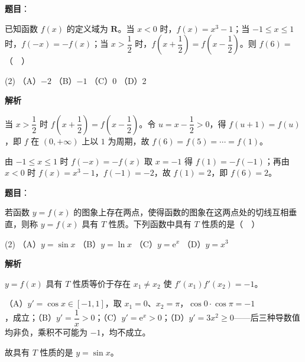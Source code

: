 \begin{answer}

\textbf{题目}：

已知函数 \(f(x)\) 的定义域为 \(\mathbf{R}\)。当 \(x<0\) 时，\(f(x)=x^3-1\)；当 \(-1\leqslant x\leqslant 1\) 时，\(f(-x)=-f(x)\)；当 \(x>\dfrac{1}{2}\) 时，\(f\left(x+\dfrac{1}{2}\right)=f\left(x-\dfrac{1}{2}\right)\)。则 \(f(6)=\)（　）

\begin{gkopts}(2)
\task （A）\(-2\)
\task （B）\(-1\)
\task （C）0
\task （D）2
\end{gkopts}

\textbf{解析}

当 \(x>\dfrac{1}{2}\) 时 \(f\left(x+\dfrac{1}{2}\right)=f\left(x-\dfrac{1}{2}\right)\)。令 \(u=x-\dfrac{1}{2}>0\)，得 \(f(u+1)=f(u)\)，即 \(f\) 在 \((0,+\infty)\) 上以 \(1\) 为周期，故 \(f(6)=f(5)=\cdots=f(1)\)。

由 \(-1\leqslant x\leqslant 1\) 时 \(f(-x)=-f(x)\) 取 \(x=-1\) 得 \(f(1)=-f(-1)\)；再由 \(x<0\) 时 \(f(x)=x^{3}-1\)，\(f(-1)=-2\)，故 \(f(1)=2\)，即 \(f(6)=2\)。


\end{answer}
\begin{answer}

\textbf{题目}：

若函数 \(y=f(x)\) 的图象上存在两点，使得函数的图象在这两点处的切线互相垂直，则称 \(y=f(x)\) 具有 \(T\) 性质。下列函数中具有 \(T\) 性质的是（　）

\begin{gkopts}(2)
\task （A）\(y=\sin x\)
\task （B）\(y=\ln x\)
\task （C）\(y=\mathrm{e}^x\)
\task （D）\(y=x^3\)
\end{gkopts}

\textbf{解析}

\(y=f(x)\) 具有 \(T\) 性质等价于存在 \(x_{1}\ne x_{2}\) 使 \(f'(x_{1})f'(x_{2})=-1\)。

（A）\(y'=\cos x\in[-1,1]\)，取 \(x_{1}=0\)、\(x_{2}=\pi\)，\(\cos 0\cdot\cos\pi=-1\)，成立；（B）\(y'=\dfrac{1}{x}>0\)；（C）\(y'=\mathrm{e}^{x}>0\)；（D）\(y'=3x^{2}\geqslant 0\)——后三种导数值均非负，乘积不可能为 \(-1\)，均不成立。

故具有 \(T\) 性质的是 \(y=\sin x\)。


\end{answer}
